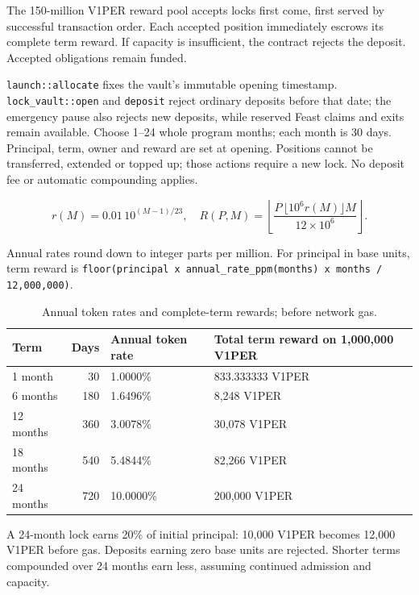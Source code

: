 \documentclass[11pt]{article}
\newcommand{\VOnePER}{\texorpdfstring{V\textcolor{brandone}{1}PER}{V1PER}}
\begin{document}
The 150-million \VOnePER{} reward pool accepts locks first come, first served by successful transaction order. Each accepted position immediately escrows its complete term reward. If capacity is insufficient, the contract rejects the deposit. Accepted obligations remain funded.

\texttt{launch::allocate} fixes the vault's immutable opening timestamp. \texttt{lock\_vault::open} and \texttt{deposit} reject ordinary deposits before that date; the emergency pause also rejects new deposits, while reserved Feast claims and exits remain available. Choose 1--24 whole program months; each month is 30 days. Principal, term, owner and reward are set at opening. Positions cannot be transferred, extended or topped up; those actions require a new lock. No deposit fee or automatic compounding applies.

\begin{equation}
r(M)=0.01\,10^{(M-1)/23},\quad R(P,M)=\left\lfloor \frac{P\,\lfloor 10^6 r(M)\rfloor M}{12\times10^6}\right\rfloor.
\end{equation}

Annual rates round down to integer parts per million. For principal in base units, term reward is \texttt{floor(principal  x  annual\_rate\_ppm(months)  x  months / 12,000,000)}.

\begin{table}[H]\centering\small
\caption{Annual token rates and complete-term rewards; before network gas.}
\begin{tabularx}{\textwidth}{l r X X}
\toprule
\textbf{Term} & \textbf{Days} & \textbf{Annual token rate} & \textbf{Total term reward on 1,000,000 \VOnePER{}} \\
\midrule
1 month & 30 & 1.0000\% & 833.333333 \VOnePER{} \\
6 months & 180 & 1.6496\% & 8,248 \VOnePER{} \\
12 months & 360 & 3.0078\% & 30,078 \VOnePER{} \\
18 months & 540 & 5.4844\% & 82,266 \VOnePER{} \\
24 months & 720 & 10.0000\% & 200,000 \VOnePER{} \\
\bottomrule\end{tabularx}
\end{table}

A 24-month lock earns 20\% of initial principal: 10,000 \VOnePER{} becomes 12,000 \VOnePER{} before gas. Deposits earning zero base units are rejected. Shorter terms compounded over 24 months earn less, assuming continued admission and capacity.
\end{document}
